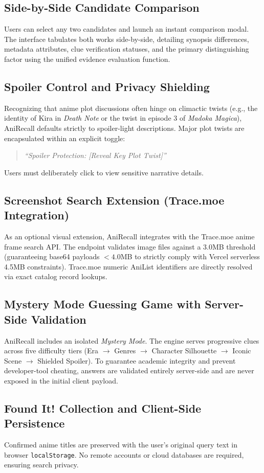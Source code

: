 \documentclass[11pt,a4paper]{article}
\begin{document}
\subsection{Side-by-Side Candidate Comparison}
Users can select any two candidates and launch an instant comparison modal. The interface tabulates both works side-by-side, detailing synopsis differences, metadata attributes, clue verification statuses, and the primary distinguishing factor using the unified evidence evaluation function.

\subsection{Spoiler Control and Privacy Shielding}
Recognizing that anime plot discussions often hinge on climactic twists (e.g., the identity of Kira in \textit{Death Note} or the twist in episode 3 of \textit{Madoka Magica}), AniRecall defaults strictly to spoiler-light descriptions. Major plot twists are encapsulated within an explicit toggle:
\begin{quote}
\textit{``Spoiler Protection: [Reveal Key Plot Twist]''}
\end{quote}
Users must deliberately click to view sensitive narrative details.

\subsection{Screenshot Search Extension (Trace.moe Integration)}
As an optional visual extension, AniRecall integrates with the Trace.moe anime frame search API. The endpoint validates image files against a 3.0MB threshold (guaranteeing base64 payloads $< 4.0$MB to strictly comply with Vercel serverless 4.5MB constraints). Trace.moe numeric AniList identifiers are directly resolved via exact catalog record lookups.

\subsection{Mystery Mode Guessing Game with Server-Side Validation}
AniRecall includes an isolated \textit{Mystery Mode}. The engine serves progressive clues across five difficulty tiers (Era $\to$ Genres $\to$ Character Silhouette $\to$ Iconic Scene $\to$ Shielded Spoiler). To guarantee academic integrity and prevent developer-tool cheating, answers are validated entirely server-side and are never exposed in the initial client payload.

\subsection{Found It! Collection and Client-Side Persistence}
Confirmed anime titles are preserved with the user's original query text in browser \texttt{localStorage}. No remote accounts or cloud databases are required, ensuring search privacy.
\end{document}
